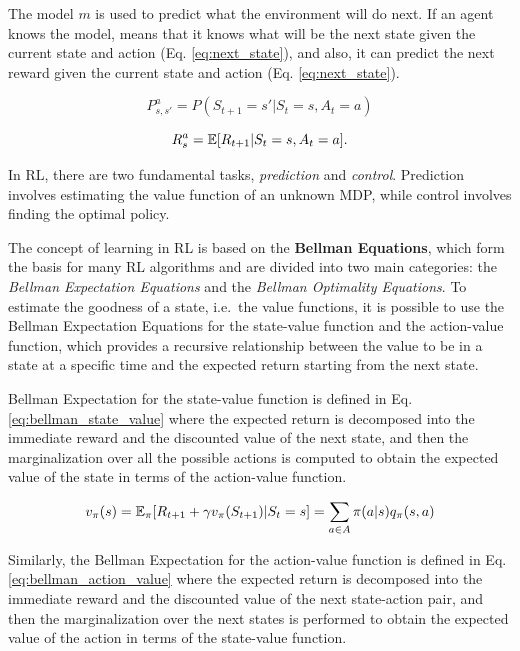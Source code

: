 The model $m$ is used to predict what the environment will do next.
If an agent knows the model, means that it knows what will be the next state given the current state and action (Eq. \ref{eq:next_state}), and also, it can predict the next reward given the current state and action (Eq. \ref{eq:next_state}). 

\begin{equation} \label{eq:next_state}
    P_{s, s'}^a = P(S_{t+1} = s' | S_t = s, A_t = a)
\end{equation}

\begin{equation} \label{eq:next_reward}
    R_s^a = \operatorname{\mathbb{E}}[R_{t+1} | S_t = s, A_t = a].
\end{equation}

In RL, there are two fundamental tasks, \textit{prediction} and \textit{control}.
Prediction involves estimating the value function of an unknown MDP, while control involves finding the optimal policy.

The concept of learning in RL is based on the \textbf{Bellman Equations}, which form the basis for many RL algorithms and are divided into two main categories: the \textit{Bellman Expectation Equations} and the \textit{Bellman Optimality Equations}.
To estimate the goodness of a state, i.e.\ the value functions, it is possible to use the Bellman Expectation Equations for the state-value function and the action-value function, which provides a recursive relationship between the value to be in a state at a specific time and the expected return starting from the next state.

Bellman Expectation for the state-value function is defined in Eq. \ref{eq:bellman_state_value} where the expected return is decomposed into the immediate reward and the discounted value of the next state, and then the marginalization over all the possible actions is computed to obtain the expected value of the state in terms of the action-value function.

\begin{equation} \label{eq:bellman_state_value}
    v_{\pi}(s) = \operatorname{\mathbb{E}}_{\pi}[R_{t+1} + \gamma v_{\pi}(S_{t+1}) | S_t = s] = \sum_{a \in A} \pi(a|s)q_{\pi}(s, a)
\end{equation}

Similarly, the Bellman Expectation for the action-value function is defined in Eq. \ref{eq:bellman_action_value} where the expected return is decomposed into the immediate reward and the discounted value of the next state-action pair, and then the marginalization over the next states is performed to obtain the expected value of the action in terms of the state-value function.

